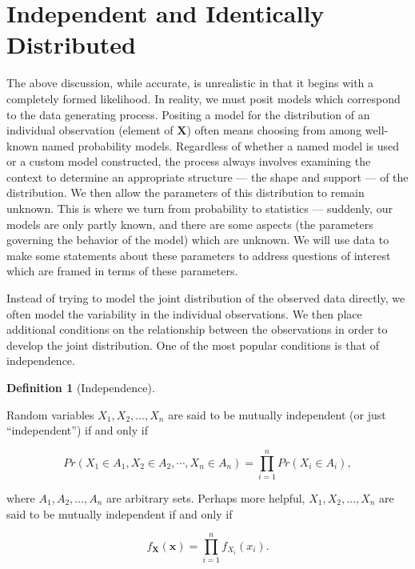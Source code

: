 \documentclass[
  letterpaper,
  DIV=11,
  numbers=noendperiod]{scrreprt}
\theoremstyle{definition}
\newtheorem{definition}{Definition}[chapter]
\theoremstyle{plain}
\theoremstyle{definition}
\theoremstyle{remark}
\begin{document}
\hypertarget{independent-and-identically-distributed}{%
\section{Independent and Identically
Distributed}\label{independent-and-identically-distributed}}

The above discussion, while accurate, is unrealistic in that it begins
with a completely formed likelihood. In reality, we must posit models
which correspond to the data generating process. Positing a model for
the distribution of an individual observation (element of
\(\mathbf{X}\)) often means choosing from among well-known named
probability models. Regardless of whether a named model is used or a
custom model constructed, the process always involves examining the
context to determine an appropriate structure --- the shape and support
--- of the distribution. We then allow the parameters of this
distribution to remain unknown. This is where we turn from probability
to statistics --- suddenly, our models are only partly known, and there
are some aspects (the parameters governing the behavior of the model)
which are unknown. We will use data to make some statements about these
parameters to address questions of interest which are framed in terms of
these parameters.

Instead of trying to model the joint distribution of the observed data
directly, we often model the variability in the individual observations.
We then place additional conditions on the relationship between the
observations in order to develop the joint distribution. One of the most
popular conditions is that of independence.

\begin{definition}[Independence]\protect\hypertarget{def-independence}{}\label{def-independence}

Random variables \(X_1, X_2, \dotsc, X_n\) are said to be mutually
independent (or just ``independent'') if and only if

\[Pr\left(X_1 \in A_1, X_2 \in A_2, \dotsb, X_n \in A_n\right) = \prod_{i=1}^{n} Pr\left(X_i \in A_i\right),\]

where \(A_1, A_2, \dotsc, A_n\) are arbitrary sets. Perhaps more
helpful, \(X_1, X_2, \dotsc, X_n\) are said to be mutually independent
if and only if

\[f_{\mathbf{X}}(\mathbf{x}) = \prod_{i=1}^{n} f_{X_i}\left(x_i\right).\]

\end{definition}
\end{document}
